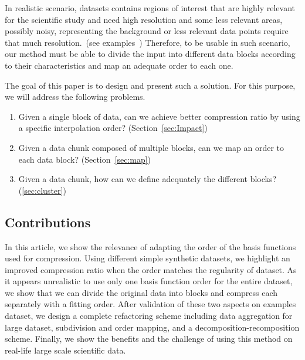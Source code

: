 \documentclass[conference]{IEEEtran}
\theoremstyle{remark}
\begin{document}
In realistic scenario, datasets contains regions of interest that are highly relevant for the scientific study and need high resolution and some less relevant areas, possibly noisy, representing the background or less relevant data points require that much resolution.~(see examples~\cite{ku2016new,ullrich2021tempestextremes,feistauer2015numerical}) %
Therefore, to be usable in such scenario, our method must be able to divide the input into different data blocks according to their characteristics and map an adequate order to each one.

The goal of this paper is to design and present such a solution.
For this purpose, we will address the following problems.
\begin{enumerate}
    \item Given a single block of data, can we achieve better compression ratio by using a specific interpolation order? (Section~\ref{sec:Impact})
    \item Given a data chunk composed of multiple blocks, can we map an order to each data block? (Section~\ref{sec:map})
    \item Given a data chunk, how can we define adequately the different blocks? (\ref{sec:cluster})
\end{enumerate}

\subsection{Contributions}
In this article, we show the relevance of adapting the order of the basis functions used for compression.%
Using different simple synthetic datasets, we highlight an improved compression ratio when the order matches the regularity of dataset.
As it appears unrealistic to use only one basis function order for the entire dataset, we show that we can divide the original data into blocks and compress each separately with a fitting order. 
After validation of these two aspects on examples dataset, we design a complete refactoring scheme including data aggregation for large dataset, subdivision and order mapping, and a decomposition-recomposition scheme. 
Finally, we show the benefits and the challenge of using this method on real-life large scale scientific data.
\end{document}
